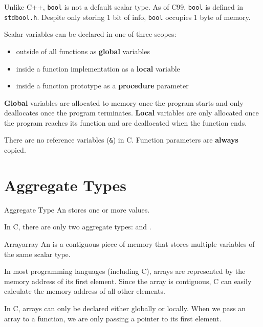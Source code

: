 \documentclass[12pt]{report}
\begin{document}
Unlike C++, \texttt{bool} is not a default scalar type. As of C99, \texttt{bool} is defined in \texttt{stdbool.h}. Despite only storing 1 bit of info, \texttt{bool} occupies 1 byte of memory.


Scalar variables can be declared in one of three scopes:
\begin{itemize}
    \item outside of all functions as \textbf{global} variables
    \item inside a function implementation as a \textbf{local} variable
    \item inside a function prototype as a \textbf{procedure} parameter
\end{itemize}

\textbf{Global} variables are allocated to memory once the program starts and only deallocates once the program terminates. \textbf{Local} variables are only allocated once the program reaches its function and are deallocated when the function ends.

\begin{notebox}
    There are no reference variables (\texttt{\&}) in C. Function parameters are \textbf{always} copied.
\end{notebox}

\section{Aggregate Types}

\begin{dfnbox}{Aggregate Type}{}
    An  stores one or more values.
\end{dfnbox}

In C, there are only two aggregate types:  and .

\begin{dfnbox}{Array}{array}
    An  is a contiguous piece of memory that stores multiple variables of the same scalar type.
\end{dfnbox}

In most programming languages (including C), arrays are represented by the memory address of its first element. Since the array is contiguous, C can easily calculate the memory address of all other elements.


In C, arrays can only be declared either globally or locally. When we pass an array to a function, we are only passing a pointer to its first element.
\end{document}
